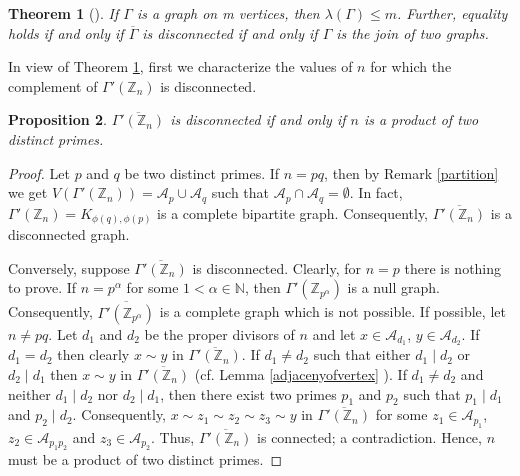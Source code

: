 \documentclass{amsart}
\theoremstyle{plain}
\newtheorem{theorem}{Theorem}[section]
\newtheorem{proposition}[theorem]{Proposition}
\theoremstyle{definition}
\theoremstyle{remark}
\begin{document}
\begin{theorem}[\cite{fiedler1973algebraic}]\label{Spectralradius} 
If $\Gamma$ is a graph on m vertices, then $\lambda(\Gamma) \le m $. Further, equality holds if and only if $\overline{\Gamma}$ is disconnected if and only if $\Gamma$ is the join of two graphs.
\end{theorem}

In view of Theorem \ref{Spectralradius}, first we characterize the values of $n$ for which the complement of $\Gamma'(\mathbb{Z}_n)$ is disconnected.

\begin{proposition}\label{connectednessofcomplement}
$\overline{\Gamma'(\mathbb{Z}_n)}$ is disconnected if and only if $n$ is a product of two distinct primes.
\end{proposition}

\begin{proof}
Let $p$ and $q$ be two distinct primes. If $n= pq$, then by Remark \ref{partition} we get $V(\Gamma'(\mathbb{Z}_n)) = \mathcal{A}_p \cup \mathcal{A}_q$ such that $\mathcal{A}_p \cap \mathcal{A}_q = \emptyset $. In fact, $\Gamma'(\mathbb{Z}_n) = K_{\phi (q), \phi(p)}$ is a complete bipartite graph. Consequently, $\overline{\Gamma'(\mathbb{Z}_n)}$ is a disconnected graph.

Conversely, suppose $\overline{\Gamma'(\mathbb{Z}_n)}$ is disconnected. Clearly, for $n = p$ there is nothing to prove. If $n = p^\alpha$ for some $1 < \alpha \in \mathbb{N}$, then $\Gamma'(\mathbb{Z}_{p^\alpha})$ is a null graph. Consequently, $\overline{\Gamma'(\mathbb{Z}_{p^\alpha})}$ is a complete graph which is not possible.  If possible, let $n \ne pq$. Let $d_1$ and $d_2$ be the proper divisors of $n$ and let $x \in  \mathcal{A}_{d_1} $, $y \in  \mathcal{A}_{d_2} $. If $d_1 = d_2$ then clearly $x \sim y$ in  $\overline{\Gamma'(\mathbb{Z}_n)}$. If $ d_1 \ne d_2$ such that either $d_1 \mid d_2$ or $d_2 \mid d_1$ then $x \sim y$ in $\overline{\Gamma'(\mathbb{Z}_n)}$ (cf. Lemma \ref{adjacenyofvertex} ). If $d_1 \ne d_2$ and neither $d_1 \mid d_2$ nor $d_2 \mid d_1$, then there exist two primes $p_1$ and $p_2$ such that $p_1 \mid d_1$ and $p_2 \mid d_2$. Consequently, $x \sim z_1 \sim z_2 \sim z_3 \sim y$ in $\overline{\Gamma'(\mathbb{Z}_n)}$ for some $z_1 \in \mathcal{A}_{p_1}$, $z_2 \in \mathcal{A}_{p_1p_2}$ and $z_3 \in \mathcal{A}_{p_2}$. Thus, $\overline{\Gamma'(\mathbb{Z}_n)}$ is connected; a contradiction. Hence, $n$ must be a product of two distinct primes.
\end{proof}
\end{document}
